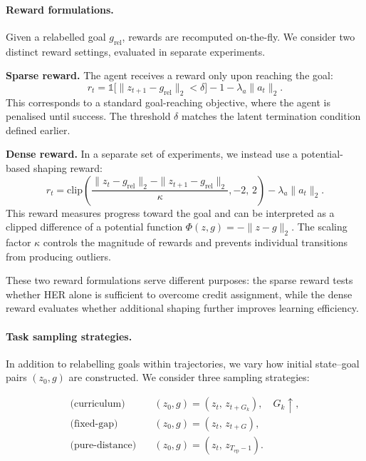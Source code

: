 \paragraph{Reward formulations.}
Given a relabelled goal $g_{\mathrm{rel}}$, rewards are recomputed
on-the-fly. We consider two distinct reward settings, evaluated in
separate experiments.

\textbf{Sparse reward.} The agent receives a reward only upon reaching
the goal:
\begin{equation}
r_t =
\mathbb{1}\!\big[\|z_{t+1} - g_{\mathrm{rel}}\|_2 < \delta\big] - 1
- \lambda_a \|a_t\|_2.
\label{eq:her-sparse-clean}
\end{equation}
This corresponds to a standard goal-reaching objective, where the agent
is penalised until success. The threshold $\delta$ matches the latent
termination condition defined earlier.

\textbf{Dense reward.} In a separate set of experiments, we instead use a
potential-based shaping reward:
\begin{equation}
r_t =
\mathrm{clip}\!\left(
\frac{\|z_t - g_{\mathrm{rel}}\|_2 - \|z_{t+1} - g_{\mathrm{rel}}\|_2}{\kappa},
-2,\,2
\right)
- \lambda_a \|a_t\|_2.
\label{eq:her-dense-clean}
\end{equation}
This reward measures progress toward the goal and can be interpreted as a
clipped difference of a potential function
$\Phi(z,g) = -\|z - g\|_2$. The scaling factor $\kappa$ controls the
magnitude of rewards and prevents individual transitions from producing
outliers.

These two reward formulations serve different purposes: the sparse
reward tests whether HER alone is sufficient to overcome credit
assignment, while the dense reward evaluates whether additional shaping
further improves learning efficiency.

\paragraph{Task sampling strategies.}
In addition to relabelling goals within trajectories, we vary how initial
state–goal pairs $(z_0, g)$ are constructed. We consider three sampling
strategies:

\begin{align}
\text{(curriculum)}\quad & (z_0, g) = (z_t,\, z_{t + G_k}), \quad G_k \uparrow,
\\
\text{(fixed-gap)}\quad & (z_0, g) = (z_t,\, z_{t + G}),
\\
\text{(pure-distance)}\quad & (z_0, g) = (z_t,\, z_{T_{\mathrm{ep}}-1}).
\end{align}

